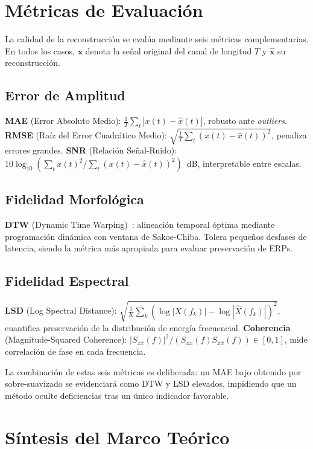 \section{Métricas de Evaluación}

La calidad de la reconstrucción se evalúa mediante seis métricas complementarias. En todos los casos, $\mathbf{x}$ denota la señal original del canal de longitud $T$ y $\hat{\mathbf{x}}$ su reconstrucción.

\subsection{Error de Amplitud}

\textbf{MAE} (Error Absoluto Medio): $\frac{1}{T} \sum_t |x(t) - \hat{x}(t)|$, robusto ante \textit{outliers}. \textbf{RMSE} (Raíz del Error Cuadrático Medio): $\sqrt{\frac{1}{T} \sum_t (x(t) - \hat{x}(t))^2}$, penaliza errores grandes. \textbf{SNR} (Relación Señal-Ruido): $10 \log_{10}(\sum_t x(t)^2 / \sum_t (x(t) - \hat{x}(t))^2)$~dB, interpretable entre escalas.

\subsection{Fidelidad Morfológica}

\textbf{DTW} (Dynamic Time Warping)~\cite{sakoe1978dynamic}: alineación temporal óptima mediante programación dinámica con ventana de Sakoe-Chiba. Tolera pequeños desfases de latencia, siendo la métrica más apropiada para evaluar preservación de ERPs.

\subsection{Fidelidad Espectral}

\textbf{LSD} (Log Spectral Distance): $\sqrt{\frac{1}{K} \sum_k (\log |X(f_k)| - \log |\hat{X}(f_k)|)^2}$, cuantifica preservación de la distribución de energía frecuencial. \textbf{Coherencia} (Magnitude-Squared Coherence): $|S_{x\hat{x}}(f)|^2 / (S_{xx}(f) S_{\hat{x}\hat{x}}(f)) \in [0,1]$, mide correlación de fase en cada frecuencia.

La combinación de estas seis métricas es deliberada: un MAE bajo obtenido por sobre-suavizado se evidenciará como DTW y LSD elevados, impidiendo que un método oculte deficiencias tras un único indicador favorable.

\section{Síntesis del Marco Teórico}


